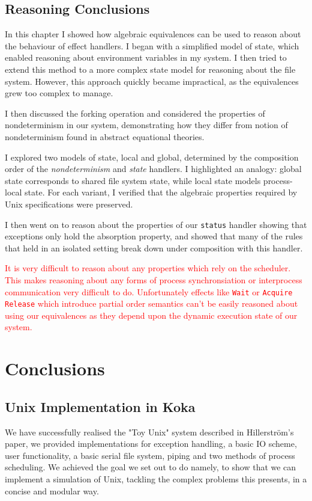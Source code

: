 \documentclass[logo,bsc,singlespacing,parskip]{infthesis}
\begin{document}
\section{Reasoning Conclusions}

In this chapter I showed how algebraic equivalences can be used to reason about the behaviour of effect handlers. I began with a simplified model of state, which enabled reasoning about environment variables in my system. I then tried to extend this method to a more complex state model for reasoning about the file system. However, this approach quickly became impractical, as the equivalences grew too complex to manage.


I then discussed the forking operation and considered the properties of nondeterminism in our system, demonstrating how they differ from notion of nondeterminism found in abstract equational theories.

I explored two models of state, local and global, determined by the composition order of the \textit{nondeterminism} and \textit{state} handlers. I highlighted an analogy: global state corresponds to shared file system state, while local state models process-local state. For each variant, I verified that the algebraic properties required by Unix specifications were preserved.


I then went on to reason about the properties of our \lstinline{status} handler showing that exceptions only hold the absorption property, and showed that many of the rules that held in an isolated setting break down under composition with this handler. 

\textcolor{red}{It is very difficult to reason about any properties which rely on the scheduler. This makes reasoning about any forms of process synchronsiation or interprocess communication very difficult to do. Unfortunately effects like \lstinline{Wait} or \lstinline{Acquire} \lstinline{Release} which introduce partial order semantics can't be easily reasoned about using our equivalences as they depend upon the dynamic execution state of our system.}



\chapter{Conclusions}

\section{Unix Implementation in Koka}
We have successfully realised the "Toy Unix" system described in Hillerström's paper, we provided implementations for exception handling, a basic IO scheme, user functionality, a basic serial file system, piping and two methods of process scheduling. We achieved the goal we set out to do namely, to show that we can implement a simulation of Unix, tackling the complex problems this presents, in a concise and modular way.
\end{document}
